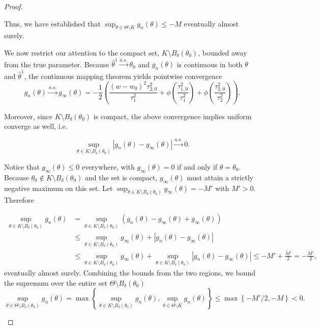 \documentclass[accepted]{uai2026} %
\theoremstyle{boldremark}
\begin{document}
\begin{proof}
\begin{itemize}
Thus, we have established  that $\sup_{\theta \in \Theta \setminus K} g_n(\theta) \leq -M$ eventually almost surely.


We now restrict our attention to the compact set, $K \setminus B_\delta(\theta_0)$, bounded away from the true parameter. Because $\hat{\theta}^1 \xrightarrow{a.s.} \theta_0$ and $g_n(\theta)$ is continuous in both $\theta$ and $\hat{\theta}^1$, the continuous mapping theorem yields pointwise convergence
\begin{equation*}
g_n(\theta) \xrightarrow{a.s.} g_{\infty}(\theta) = -\frac{1}{2} \left( \frac{(w-w_0)^2{\tau}^2_{2,0}}{\tau_{1}^2} + \phi\left(\frac{\tau_{1, 0}^2}{\tau_1^2}\right) + \phi\left(\frac{\tau_{2, 0}^2}{\tau_2^2}\right) \right).
\end{equation*}

Moreover, since $K \setminus B_{\delta}(\theta_0)$ is compact, the above convergence implies uniform converge as well, i.e.

\begin{equation*}
\sup_{\theta \in K \setminus B_\delta(\theta_0)} |g_n(\theta) - g_\infty(\theta)| \xrightarrow{a.s.} 0.
\end{equation*}


Notice that $g_\infty(\theta) \leq 0$ everywhere, with $g_\infty(\theta) = 0$ if and only if $\theta = \theta_0$. Because $\theta_0 \notin K \setminus B_\delta(\theta_0)$ and the set is compact, $g_\infty(\theta)$ must attain a strictly negative maximum on this set. Let $\sup_{\theta \in K \setminus B_\delta(\theta_0)} g_\infty(\theta) = -M'$ with $M' > 0$. Therefore

\begin{align*}
    \sup_{\theta \in K \setminus B_\delta(\theta_0)} g_n(\theta) &= \sup_{\theta \in K \setminus B_\delta(\theta_0)}  (g_n(\theta) -g_\infty(\theta)+g_\infty(\theta))\\
    &\leq \sup_{\theta \in K \setminus B_\delta(\theta_0)}  g_\infty(\theta) + |g_n(\theta)- g_\infty(\theta)|\\
    &\leq \sup_{\theta \in K \setminus B_\delta(\theta_0)}  g_\infty(\theta) + \sup_{\theta \in K \setminus B_\delta(\theta_0)}|g_n(\theta)- g_\infty(\theta)| \leq -M' + \frac{M'}{2} = -\frac{M'}{2},
\end{align*}
eventually almost surely. Combining the bounds from the two regions, we bound the supremum over the entire set $\Theta \setminus B_\delta(\theta_0)$
\begin{equation*}
\sup_{\theta \in \Theta \setminus B_\delta(\theta_0)} g_n(\theta) = \max\left\{\sup_{\theta \in K \setminus B_\delta(\theta_0)} g_n(\theta), \sup_{\theta \in \Theta \setminus K} g_n(\theta) \right\} \leq \max \left\{ -M'/2, -M \right\} < 0.
\end{equation*}


\end{itemize}
\end{proof}
\end{document}
